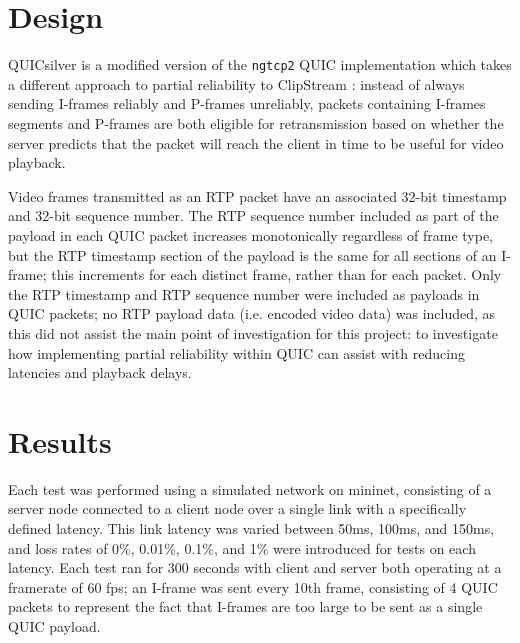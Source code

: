 \documentclass{mpaper}
\begin{document}
\section{Design}

QUICsilver is a modified version of the \texttt{ngtcp2} QUIC implementation \cite{ngtcp2} which takes a different approach to partial reliability to ClipStream \cite{Palmer2018}: instead of always sending I-frames reliably and P-frames unreliably, packets containing I-frames segments and P-frames are both eligible for retransmission based on whether the server predicts that the packet will reach the client in time to be useful for video playback. 

Video frames transmitted as an RTP packet have an associated 32-bit timestamp and 32-bit sequence number. The RTP sequence number included as part of the payload in each QUIC packet increases monotonically regardless of frame type, but the RTP timestamp section of the payload is the same for all sections of an I-frame; this increments for each distinct frame, rather than for each packet. Only the RTP timestamp and RTP sequence number were included as payloads in QUIC packets; no RTP payload data (i.e. encoded video data) was included, as this did not assist the main point of investigation for this project: to investigate how implementing partial reliability within QUIC can assist with reducing latencies and playback delays.





\section{Results}

Each test was performed using a simulated network on mininet, consisting of a server node connected to a client node over a single link with a specifically defined latency. This link latency was varied between 50ms, 100ms, and 150ms, and loss rates of 0\%, 0.01\%, 0.1\%, and 1\% were introduced for tests on each latency. Each test ran for 300 seconds with client and server both operating at a framerate of 60 fps; an I-frame was sent every 10th frame, consisting of 4 QUIC packets to represent the fact that I-frames are too large to be sent as a single QUIC payload.
\end{document}
